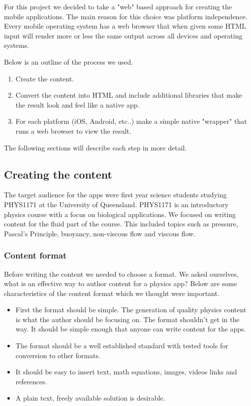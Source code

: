 \documentclass[12pt,a4paper]{article}  %
\begin{document}
For this project we decided to take a "web" based approach for creating the mobile applications. The main reason for this choice was platform independence. Every mobile operating system has a web browser that when given some HTML input will render more or less the same output across all devices and operating systems.

Below is an outline of the process we used.
\begin{enumerate}
\item Create the content.
\item Convert the content into HTML and include additional libraries that make the result look and feel like a native app.
\item For each platform (iOS, Android, etc..) make a simple native "wrapper" that runs a web browser to view the result.
\end{enumerate}
The following sections will describe each step in more detail.

\subsection{Creating the content}

The target audience for the apps were first year science students studying PHYS1171 at the University of Queensland. PHYS1171 is an introductory physics course with a focus on biological applications. We focused on writing content for the fluid part of the course. This included topics such as pressure, Pascal's Principle, buoyancy, non-viscous flow and viscous flow.

\subsubsection{Content format}

Before writing the content we needed to choose a format. We asked ourselves, what is an effective way to author content for a physics app? Below are some characteristics of the content format which we thought were important.

\begin{itemize}
\item First the format should be simple. The generation of quality physics content is what the author should be focusing on. The format shouldn't get in the way. It should be simple enough that anyone can write content for the apps.
\item The format should be a well established standard with tested tools for conversion to other formats.
\item It should be easy to insert text, math equations, images, videos links and references.
\item A plain text, freely available solution is desirable.
\end{itemize}
\end{document}
